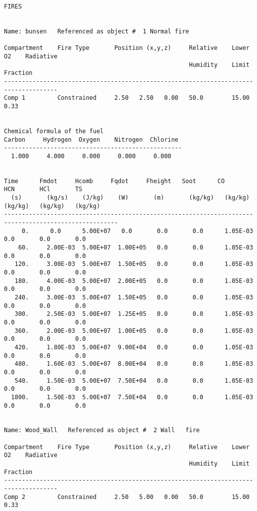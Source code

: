 \begin{lstlisting}[basicstyle=\tiny]
FIRES


Name: bunsen   Referenced as object #  1 Normal fire

Compartment    Fire Type       Position (x,y,z)     Relative    Lower O2    Radiative
                                                    Humidity    Limit       Fraction
-------------------------------------------------------------------------------------
Comp 1         Constrained     2.50   2.50   0.00   50.0        15.00        0.33


Chemical formula of the fuel
Carbon     Hydrogen  Oxygen    Nitrogen  Chlorine
--------------------------------------------------
  1.000     4.000     0.000     0.000     0.000


Time      Fmdot     Hcomb     Fqdot     Fheight   Soot      CO        HCN       HCl       TS
  (s)       (kg/s)    (J/kg)    (W)       (m)       (kg/kg)   (kg/kg)   (kg/kg)   (kg/kg)   (kg/kg)
------------------------------------------------------------------------------------------------------
     0.      0.0      5.00E+07   0.0       0.0       0.0      1.05E-03   0.0       0.0       0.0
    60.     2.00E-03  5.00E+07  1.00E+05   0.0       0.0      1.05E-03   0.0       0.0       0.0
   120.     3.00E-03  5.00E+07  1.50E+05   0.0       0.0      1.05E-03   0.0       0.0       0.0
   180.     4.00E-03  5.00E+07  2.00E+05   0.0       0.0      1.05E-03   0.0       0.0       0.0
   240.     3.00E-03  5.00E+07  1.50E+05   0.0       0.0      1.05E-03   0.0       0.0       0.0
   300.     2.50E-03  5.00E+07  1.25E+05   0.0       0.0      1.05E-03   0.0       0.0       0.0
   360.     2.00E-03  5.00E+07  1.00E+05   0.0       0.0      1.05E-03   0.0       0.0       0.0
   420.     1.80E-03  5.00E+07  9.00E+04   0.0       0.0      1.05E-03   0.0       0.0       0.0
   480.     1.60E-03  5.00E+07  8.00E+04   0.0       0.0      1.05E-03   0.0       0.0       0.0
   540.     1.50E-03  5.00E+07  7.50E+04   0.0       0.0      1.05E-03   0.0       0.0       0.0
  1800.     1.50E-03  5.00E+07  7.50E+04   0.0       0.0      1.05E-03   0.0       0.0       0.0


Name: Wood_Wall   Referenced as object #  2 Wall   fire

Compartment    Fire Type       Position (x,y,z)     Relative    Lower O2    Radiative
                                                    Humidity    Limit       Fraction
-------------------------------------------------------------------------------------
Comp 2         Constrained     2.50   5.00   0.00   50.0        15.00        0.33



\end{lstlisting}
